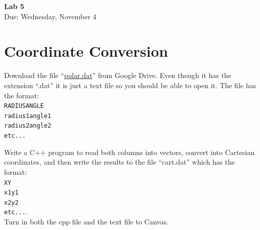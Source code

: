 \documentclass{article}
\begin{document}
\fancyfoot[C]{\thepage}
\vspace*{0cm}
\begin{center}
	{\LARGE \textbf{Lab 5}}\\
	\vspace{0.25cm}
	{\Large Due: Wednesday, November 4}
\end{center}

\section{Coordinate Conversion}
Download the file ``\href{https://drive.google.com/file/d/157-9-Smc-iNxmKykxQCZZWctQsxaUfLu/view?usp=sharing}{polar.dat}'' from Google Drive. Even though it has the extension ``.dat'' it is just a text file so you should be able to open it. The file has the format:\\
\texttt{RADIUS\quad ANGLE\\ radius1\quad angle1\\ radius2\quad angle2\\etc...}

Write a C++ program to read both columns into vectors, convert into Cartesian coordinates, and then write the results to the file ``cart.dat'' which has the format:\\
\texttt{X\quad Y\\ x1\quad y1\\ x2\quad y2\\etc...}. 
\\Turn in both the cpp file and the text file to Canvas.
\end{document}
